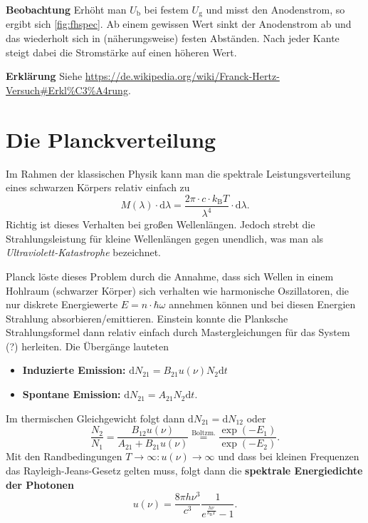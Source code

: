 \textbf{Beobachtung}  Erhöht man $U_\text{b}$ bei festem $U_\text{g}$ und misst den Anodenstrom, so ergibt sich \autoref{fig:fhspec}.
Ab einem gewissen Wert sinkt der Anodenstrom ab und das wiederholt sich in (näherungsweise) festen Abständen.
Nach jeder Kante steigt dabei die Stromstärke auf einen höheren Wert.

\textbf{Erklärung}  Siehe \url{https://de.wikipedia.org/wiki/Franck-Hertz-Versuch#Erkl%C3%A4rung}.

\section{Die Planckverteilung}
Im Rahmen der klassischen Physik kann man die spektrale Leistungsverteilung eines schwarzen Körpers relativ einfach zu
\begin{equation*}
	M(\lambda)\cdot\text{d}\lambda = \frac{2\pi\cdot c\cdot k_\text{B}T}{\lambda^4}\cdot\text{d}\lambda.
\end{equation*}
Richtig ist dieses Verhalten bei großen Wellenlängen.
Jedoch strebt die Strahlungsleistung für kleine Wellenlängen gegen unendlich, was man als \textit{Ultraviolett-Katastrophe} bezeichnet.

Planck löste dieses Problem durch die Annahme, dass sich Wellen in einem Hohlraum (schwarzer Körper) sich verhalten wie harmonische Oszillatoren, die nur diskrete Energiewerte $E=n\cdot\hbar\omega$ annehmen können und bei diesen Energien Strahlung absorbieren/emittieren.
Einstein konnte die Planksche Strahlungsformel dann relativ einfach durch Mastergleichungen für das System (?) herleiten.
Die Übergänge lauteten
\begin{itemize}
	\item \textbf{Induzierte Emission:} $\text{d}N_{21} = B_{21}u(\nu)N_2\text{d}t$
	\item \textbf{Spontane Emission:} $\text{d}N_{21} = A_{21}N_2\text{d}t$.
\end{itemize}
Im thermischen Gleichgewicht folgt dann $\text{d}N_{21} = \text{d}N_{12}$ oder
\begin{equation*}
	\frac{N_2}{N_1} = \frac{B_{12}u(\nu)}{A_{21}+B_{21}u(\nu)} \stackrel{\text{Boltzm.}}{=} \frac{\exp(-E_1)}{\exp(-E_2)}.
\end{equation*}
Mit den Randbedingungen $T\rightarrow\infty : u(\nu)\rightarrow\infty$ und dass bei kleinen Frequenzen das Rayleigh-Jeans-Gesetz gelten muss, folgt dann die \textbf{spektrale Energiedichte der Photonen}
\begin{equation*}
	u(\nu) = \frac{8\pi h\nu^3}{c^3}\frac{1}{e^{\frac{h\nu}{k_\text{B}T}} - 1}.
\end{equation*}

